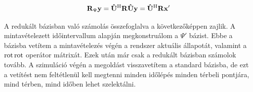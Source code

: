             \begin{equation}
                \mathbf{R}_{\Psi}\mathbf{y} =
                \mathbf{\hat{U}}^{\mathrm{H}}\mathbf{R}\mathbf{\hat{U}}\mathbf{y} =
                \mathbf{\hat{U}}^{\mathrm{H}}\mathbf{R}\mathbf{x'}
            \end{equation}
            \par
            A redukált bázisban való számolás összefoglalva a következőképpen zajlik. A mintavételezett időintervallum alapján megkonstruálom a $\Psi'$ bázist. Ebbe a bázisba vetítem a mintavételezés végén a rendszer aktuális állapotát, valamint a $\operatorname{rot}\operatorname{rot}$ operátor mátrixát. Ezek után már csak a redukált bázisban számolok tovább. A szimuláció végén a megoldást visszavetítem a standard bázisba, de ezt a vetítést nem feltétlenül kell megtenni minden időlépés minden térbeli pontjára, mind térben, mind időben lehet szelektálni.
